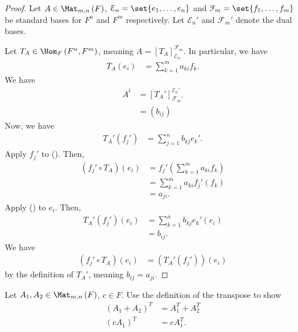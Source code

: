 \documentclass[10pt]{mypackage}
\begin{document}
\begin{proof}
  Let $A\in \Mat_{m,n}\left(F\right)$, $\mathcal{E}_n = \set{e_1,\dots,e_n}$ and $\mathcal{F}_m = \set{f_1,\dots,f_m}$ be standard bases for $F^n$ and $F^m$ respectively. Let $\mathcal{E}_n'$ and $\mathcal{F}_m'$ denote the dual bases.\newline

  Let $T_A \in \Hom_F\left(F^n,F^m\right)$, meaning $A = \left[T_A\right]_{\mathcal{E}_n}^{\mathcal{F}_m}$. In particular, we have
  \begin{align*}
    T_A\left(e_i\right) &= \sum_{k=1}^{m}a_{ki}f_k. \tag*{(\textasteriskcentered)}
  \end{align*}
  We have
  \begin{align*}
    A^{t} &= \left[T_{A}'\right]_{\mathcal{F}_m'}^{\mathcal{E}_n'} \tag*{(\textasteriskcentered\textasteriskcentered)}\\
          &= \left(b_{ij}\right)
  \end{align*}
  Now, we have
  \begin{align*}
    T_{A}' \left(f_j'\right) &= \sum_{j=1}^{n}b_{kj}e_{k}'.
  \end{align*}
  Apply $f_j'$ to (\textasteriskcentered). Then,
  \begin{align*}
    \left(f_j'\circ T_A\right)\left(e_i\right) &= f_j'\left(\sum_{k=1}^{m}a_{ki}f_k\right)\\
                                               &= \sum_{k=1}^{m}a_{ki}f_j'\left(f_k\right)\\
                                               &= a_{ji}.
  \end{align*}
  Apply (\textasteriskcentered\textasteriskcentered) to $e_i$. Then,
  \begin{align*}
    T_A'\left(f_j'\right)\left(e_i\right) &= \sum_{k=1}^{n}b_{kj}e_k'\left(e_i\right)\\
                                          &= b_{ij}.
  \end{align*}
  We have
  \begin{align*}
    \left(f_j'\circ T_A\right)\left(e_i\right) &= \left(T_A'\left(f_j'\right)\right)\left(e_i\right)
  \end{align*}
  by the definition of $T_A'$, meaning $b_{ij} = a_{ji}$.
\end{proof}
\begin{exercise}
  Let $A_1,A_2\in \Mat_{m,n}\left(F\right)$, $c\in F$. Use the definition of the transpose to show
  \begin{align*}
    \left(A_1 + A_2\right)^{T} &= A_1^T + A_2^T\\
    \left(cA_1\right)^T &= cA_1^T.
  \end{align*}
\end{exercise}
\end{document}

